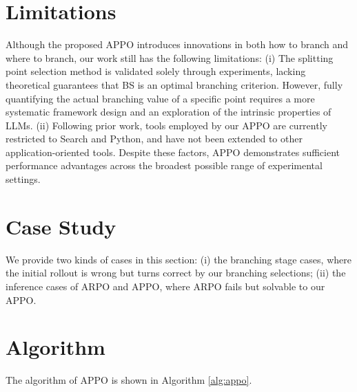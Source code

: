 \documentclass{llmxive}
\begin{document}
\section{Limitations}\label{appx:g} 
Although the proposed APPO introduces innovations in both how to branch and where to branch, our work still has the following limitations: (i) The splitting point selection method is validated solely through experiments, lacking theoretical guarantees that BS is an optimal branching criterion. However, fully quantifying the actual branching value of a specific point requires a more systematic framework design and an exploration of the intrinsic properties of LLMs. (ii) Following prior work, tools employed by our APPO are currently restricted to Search and Python, and have not been extended to other application-oriented tools.
Despite these factors, APPO demonstrates sufficient performance advantages across the broadest possible range of experimental settings.

\section{Case Study}\label{appx:h}
We provide two kinds of cases in this section: (i) the branching stage cases, where the initial rollout is wrong but turns correct by our branching selections; (ii) the inference cases of ARPO and APPO, where ARPO fails but solvable to our APPO.   

\section{Algorithm}\label{appx:i}
The algorithm of APPO is shown in Algorithm \ref{alg:appo}.
\DontPrintSemicolon
{}
\SetAlCapSkip{0.5em}
\SetAlFnt{\small}
 
\end{document}
